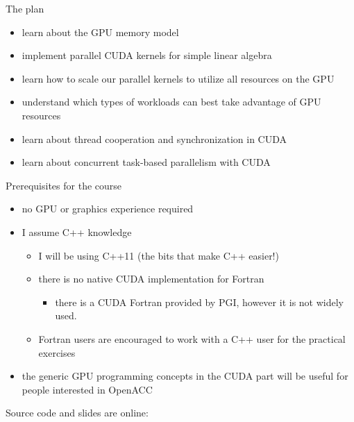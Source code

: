 
\begin{frame}[fragile]{}
    \begin{info}{The plan}
        \begin{itemize}
            \item learn about the GPU memory model
            \item implement parallel CUDA kernels for simple linear algebra
            \item learn how to scale our parallel kernels to utilize all resources on the GPU
            \item understand which types of workloads can best take advantage of GPU resources
            \item learn about thread cooperation and synchronization in CUDA
            \item learn about concurrent task-based parallelism with CUDA
        \end{itemize}
    \end{info}

\end{frame}

\begin{frame}[fragile]{}
    \begin{info}{Prerequisites for the course}
        \begin{itemize}
            \item no GPU or graphics experience required
            \item I assume C++ knowledge
            \begin{itemize}
                \item I will be using C++11 (the bits that make C++ easier!)
                \item there is no native CUDA implementation for Fortran
                \begin{itemize}
                    \item there is a CUDA Fortran provided by PGI, however it is not widely used.
                \end{itemize}
                \item Fortran users are encouraged to work with a C++ user for the practical exercises
            \end{itemize}
            \item the generic GPU programming concepts in the CUDA part will be useful for people interested in OpenACC
        \end{itemize}
    \end{info}

    \centering

    Source code and slides are online:


\end{frame}


